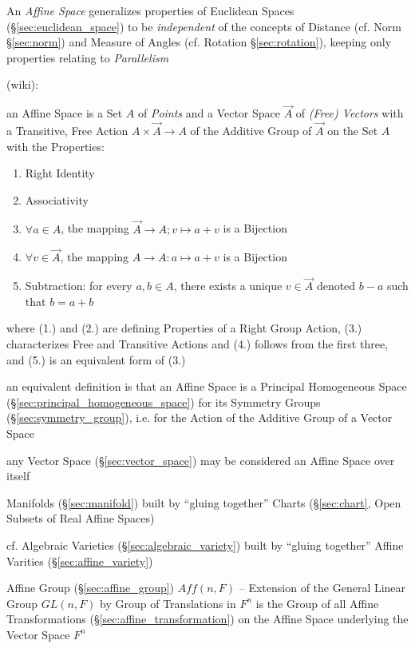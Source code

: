 An \emph{Affine Space} generalizes properties of Euclidean Spaces
(\S\ref{sec:euclidean_space}) to be \emph{independent} of the concepts of
Distance (cf. Norm \S\ref{sec:norm}) and Measure of Angles (cf. Rotation
\S\ref{sec:rotation}), keeping only properties relating to
\emph{Parallelism}

(wiki):

an Affine Space is a Set $A$ of \emph{Points} and a Vector Space $\vec{A}$ of
\emph{(Free) Vectors} with a Transitive, Free Action
$A \times \vec{A} \rightarrow A$ of the Additive Group of $\vec{A}$ on the
Set $A$ with the Properties:
\begin{enumerate}
\item Right Identity
\item Associativity
\item $\forall a \in A$, the mapping $\vec{A} \rightarrow A; v \mapsto a + v$ is
  a Bijection
\item $\forall v \in \vec{A}$, the mapping $A \rightarrow A : a \mapsto a + v$
  is a Bijection
\item Subtraction: for every $a, b \in A$, there exists a unique $v \in \vec{A}$
  denoted $b - a$ such that $b = a + b$
\end{enumerate}
where (1.) and (2.) are defining Properties of a Right Group Action, (3.)
characterizes Free and Transitive Actions and (4.) follows from the first three,
and (5.) is an equivalent form of (3.)

an equivalent definition is that an Affine Space is a Principal Homogeneous
Space (\S\ref{sec:principal_homogeneous_space}) for its Symmetry Groups
(\S\ref{sec:symmetry_group}), i.e. for the Action of the Additive Group of a
Vector Space

any Vector Space (\S\ref{sec:vector_space}) may be considered an Affine Space
over itself

Manifolds (\S\ref{sec:manifold}) built by ``gluing together'' Charts
(\S\ref{sec:chart}, Open Subsets of Real Affine Spaces)

cf. Algebraic Varieties (\S\ref{sec:algebraic_variety}) built by ``gluing
together'' Affine Varities (\S\ref{sec:affine_variety})

Affine Group (\S\ref{sec:affine_group}) $Aff(n,F)$ -- Extension of the General
Linear Group $GL(n,F)$ by Group of Translations in $F^n$ is the Group of all
Affine Transformations (\S\ref{sec:affine_transformation}) on the Affine Space
underlying the Vector Space $F^n$



